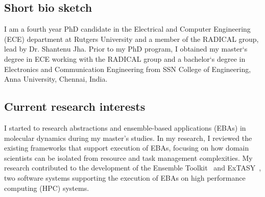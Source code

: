 \subsection{Short bio sketch}
I am a fourth year PhD candidate in the Electrical and Computer Engineering (ECE)
department at Rutgers University and a member of the RADICAL group, lead by 
Dr. Shantenu Jha. Prior to my PhD program, I obtained my master`s degree in ECE 
working with the RADICAL group and a bachelor`s degree in Electronics and 
Communication Engineering from SSN College of Engineering, Anna University, 
Chennai, India.


\subsection{Current research interests} I started to research abstractions
and ensemble-based applications (EBAs) in molecular dynamics during my
master's studies. In my research, I reviewed the existing frameworks that
support execution of EBAs, focusing on how domain scientists can be isolated
from resource and task management complexities. My research contributed to
the development of the Ensemble Toolkit~\cite{entk} and ExTASY~\cite{extasy},
two software systems supporting the execution of EBAs on high performance
computing (HPC) systems.


